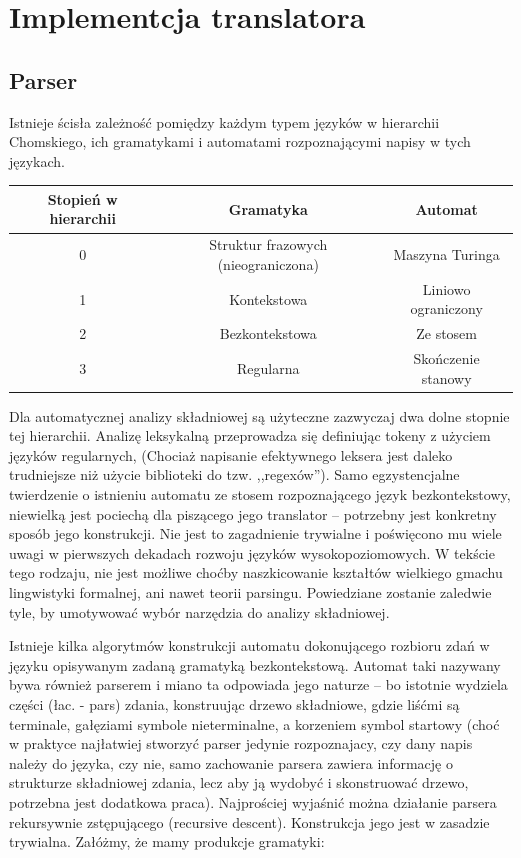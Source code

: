 \chapter{Implementcja translatora}
\section{Parser}
Istnieje ścisła zależność pomiędzy każdym typem języków w hierarchii Chomskiego, ich gramatykami i automatami rozpoznającymi napisy w tych językach.\cite{CHOMSKY1959}
\begin{center}
\begin{tabular}{|c|c|c|}
\hline
\textbf{Stopień w hierarchii} & \textbf{Gramatyka} & \textbf{Automat} \\ \hline
0 & Struktur frazowych (nieograniczona) & Maszyna Turinga \\ \hline
1 & Kontekstowa & Liniowo ograniczony\\ \hline
2 & Bezkontekstowa & Ze stosem\\ \hline
3 & Regularna & Skończenie stanowy\\ \hline
\end{tabular}
\end{center}

Dla automatycznej analizy składniowej są użyteczne zazwyczaj dwa dolne stopnie tej hierarchii. Analizę leksykalną przeprowadza się definiując tokeny z użyciem języków regularnych, (Chociaż napisanie efektywnego leksera jest daleko trudniejsze niż użycie biblioteki do tzw. ,,regexów'').
Samo egzystencjalne twierdzenie o istnieniu automatu ze stosem rozpoznającego język bezkontekstowy, niewielką jest pociechą dla piszącego jego translator – potrzebny jest konkretny sposób jego konstrukcji. Nie jest to zagadnienie trywialne i poświęcono mu wiele uwagi w pierwszych dekadach rozwoju języków wysokopoziomowych. W tekście tego rodzaju, nie jest możliwe choćby naszkicowanie kształtów wielkiego gmachu lingwistyki formalnej, ani nawet teorii parsingu. Powiedziane zostanie zaledwie tyle, by umotywować wybór narzędzia do analizy składniowej.\cite{DRAGON_BOOK}

Istnieje kilka algorytmów konstrukcji automatu dokonującego rozbioru zdań w języku opisywanym zadaną gramatyką bezkontekstową. Automat taki nazywany bywa również parserem i miano ta odpowiada jego naturze – bo istotnie wydziela części (łac. - pars) zdania, konstruując drzewo składniowe, gdzie liśćmi są terminale, gałęziami symbole nieterminalne, a korzeniem symbol startowy (choć w praktyce najłatwiej stworzyć parser jedynie rozpoznajacy, czy dany napis należy do języka, czy nie, samo zachowanie parsera zawiera informację o strukturze składniowej zdania, lecz aby ją wydobyć i skonstruować drzewo, potrzebna jest dodatkowa praca).%
Najprościej wyjaśnić można działanie parsera rekursywnie zstępującego (recursive descent). Konstrukcja jego jest w zasadzie trywialna. Załóżmy, że mamy produkcje gramatyki:

